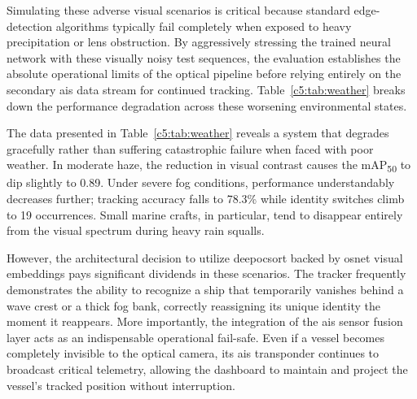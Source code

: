 Simulating these adverse visual scenarios is critical because standard edge-detection algorithms typically fail completely when exposed to heavy precipitation or lens obstruction. By aggressively stressing the trained neural network with these visually noisy test sequences, the evaluation establishes the absolute operational limits of the optical pipeline before relying entirely on the secondary \gls{ais} data stream for continued tracking. Table~\ref{c5:tab:weather} breaks down the performance degradation across these worsening environmental states.

\begin{table}[H]
\fontsize{10}{12}\selectfont
\centering
\caption{Detection and Tracking Performance Under Varying Environmental Conditions}
\label{c5:tab:weather}

\end{table}

The data presented in Table~\ref{c5:tab:weather} reveals a system that degrades gracefully rather than suffering catastrophic failure when faced with poor weather. In moderate haze, the reduction in visual contrast causes the mAP\textsubscript{50} to dip slightly to 0.89. Under severe fog conditions, performance understandably decreases further; tracking accuracy falls to 78.3\% while identity switches climb to 19 occurrences. Small marine crafts, in particular, tend to disappear entirely from the visual spectrum during heavy rain squalls.

However, the architectural decision to utilize \gls{deepocsort} backed by \gls{osnet} visual embeddings pays significant dividends in these scenarios. The tracker frequently demonstrates the ability to recognize a ship that temporarily vanishes behind a wave crest or a thick fog bank, correctly reassigning its unique identity the moment it reappears. More importantly, the integration of the \gls{ais} sensor fusion layer acts as an indispensable operational fail-safe. Even if a vessel becomes completely invisible to the optical camera, its \gls{ais} transponder continues to broadcast critical telemetry, allowing the dashboard to maintain and project the vessel's tracked position without interruption.

